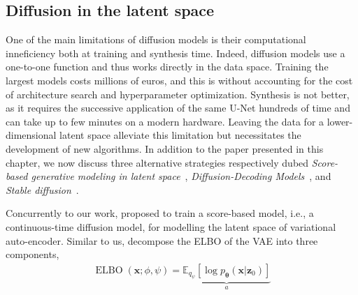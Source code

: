 \subsection{Diffusion in the latent space}
One of the main limitations of diffusion models is their computational inneficiency both at training and synthesis time. Indeed, diffusion models use a one-to-one function and thus works directly in the data space. Training the largest models costs millions of euros, and this is without accounting for the cost of architecture search and hyperparameter optimization. Synthesis is not better, as it requires the successive application of the same U-Net hundreds of time and can take up to few minutes on a modern hardware. Leaving the data for a lower-dimensional latent space alleviate this limitation but necessitates the development of new algorithms. In addition to the paper presented in this chapter, we now discuss three alternative strategies respectively dubed \textit{Score-based generative modeling in latent space}~\citep{vahdat2021score}, \textit{Diffusion-Decoding Models}~\citep{sinha2021d2c}, and \textit{Stable diffusion}~\citep{rombach2022high}.

Concurrently to our work, \citet{vahdat2021score} proposed to train a score-based model, i.e., a continuous-time diffusion model, for modelling the latent space of variational auto-encoder. Similar to us, \citet{vahdat2021score} decompose the ELBO of the VAE into three components,
\begin{align}
  \operatorname{ELBO}(\mathbf{x}; \phi, \psi) =
  \underbrace{\mathbb{E}_{q_\psi}\left[ \log p_{\mathbf{\theta}}(\mathbf{x}|\mathbf{z}_0)\right]}_{a}%
\end{align}


